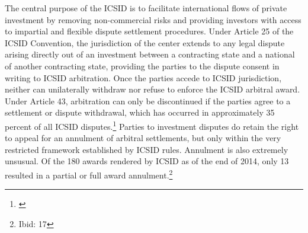 \documentclass[12pt,onesided]{amsart}
\begin{document}
The central purpose of the ICSID is to facilitate international flows of private investment by removing non-commercial risks and providing investors with access to impartial and flexible dispute settlement procedures. Under Article 25 of the ICSID Convention, the jurisdiction of the center extends to any legal dispute arising directly out of an investment between a contracting state and a national of another contracting state, providing the parties to the dispute consent in writing to ICSID arbitration. Once the parties accede to ICSID jurisdiction, neither can unilaterally withdraw nor refuse to enforce the ICSID arbitral award. Under Article 43, arbitration can only be discontinued if the parties agree to a settlement or dispute withdrawal, which has occurred in approximately 35 percent of all ICSID disputes.\footnote{\citet[p. 17]{icsid:2015}} Parties to investment disputes do retain the right to appeal for an annulment of arbitral settlements, but only within the very restricted framework established by ICSID rules. Annulment is also extremely unsusual. Of the 180 awards rendered by ICSID as of the end of 2014, only 13 resulted in a partial or full award annulment.\footnote{Ibid: 17}
\end{document}
